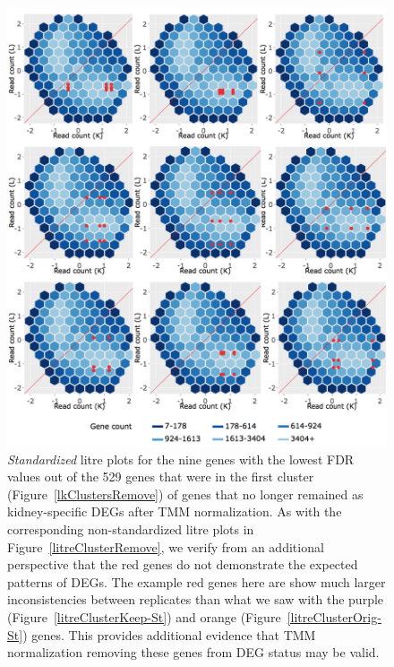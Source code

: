 \documentclass[11pt,a4paper,oldfontcommands,openany]{memoir}
\numberwithin{equation}{section} %
\begin{document}
\null
\begin{figure}[t!]
\begin{framed}
\centerline{\includegraphics[width=\columnwidth]{MakeFigures/Dashboards/litreClusterRemove-St/litreClusterRemove-St.jpg}}
\end{framed}
\caption{\textit{Standardized} litre plots for the nine genes with the lowest FDR values out of the 529 genes that were in the first cluster (Figure~\ref{lkClustersRemove}) of genes that no longer remained as kidney-specific DEGs after TMM normalization. As with the corresponding non-standardized litre plots in Figure~\ref{litreClusterRemove}, we verify from an additional perspective that the red genes do not demonstrate the expected patterns of DEGs. The example red genes here are show much larger inconsistencies between replicates than what we saw with the purple (Figure~\ref{litreClusterKeep-St}) and orange (Figure~\ref{litreClusterOrig-St}) genes. This provides additional evidence that TMM normalization removing these genes from DEG status may be valid.
\label{litreClusterRemove-St}}
\end{figure}
\end{document}
